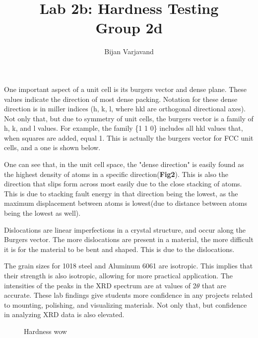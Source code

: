 \documentclass{article}
\author{Bijan Varjavand}
\title{Lab 2b: Hardness Testing\\Group 2d}
\begin{document}
\maketitle

\clearpage

One important aspect of a unit cell is its burgers vector and dense plane. These values indicate the direction of most dense packing. Notation for these dense direction is in miller indices (h, k, l, where hkl are orthogonal directional axes). Not only that, but due to symmetry of unit cells, the burgers vector is a family of h, k, and l values. For example, the family \{1 1 0\} includes all hkl values that, when squares are added, equal 1. This is actually the burgers vector for FCC unit cells, and a one is shown below.

One can see that, in the unit cell space, the "dense direction" is easily found as the highest density of atoms in a specific direction(\textbf{Fig2}). This is also the direction that slips form across most easily due to the close stacking of atoms. This is due to stacking fault energy in that direction being the lowest, as the maximum displacement between atoms is lowest(due to distance between atoms being the lowest as well).

Dislocations are linear imperfections in a crystal structure, and occur along the Burgers vector. The more dislocations are present in a material, the more difficult it is for the material to be bent and shaped. This is due to the dislocations.

The grain sizes for 1018 steel and Aluminum 6061 are isotropic. This implies that their strength is also isotropic, allowing for more practical application. The intensities of the peaks in the XRD spectrum are at values of 2$\theta$ that are accurate. These lab findings give students more confidence in any projects related to mounting, polishing, and visualizing materials. Not only that, but confidence in analyzing XRD data is also elevated.

\clearpage

\begin{figure}
	\centering
	\caption{Hardness wow}
\end{figure}
\end{document}
